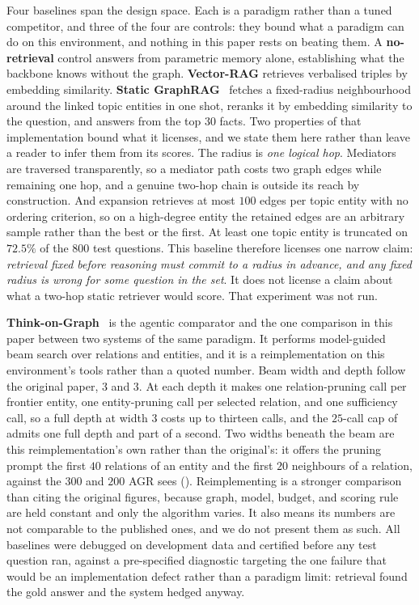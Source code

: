 Four baselines span the design space. Each is a paradigm rather than a
tuned competitor, and three of the four are controls: they bound what a
paradigm can do on this environment, and nothing in this paper rests on
beating them. A \textbf{no-retrieval} control answers from parametric
memory alone, establishing what the backbone knows without the graph.
\textbf{Vector-RAG} retrieves verbalised triples by embedding
similarity. \textbf{Static GraphRAG}~\cite{edge2024local} fetches a
fixed-radius neighbourhood around the linked topic entities in one shot,
reranks it by embedding similarity to the question, and answers from the
top $30$ facts. Two properties of that implementation bound what it
licenses, and we state them here rather than leave a reader to infer
them from its scores. The radius is \emph{one logical hop}. Mediators
are traversed transparently, so a mediator path costs two graph edges
while remaining one hop, and a genuine two-hop chain is outside its
reach by construction. And expansion retrieves at most $100$ edges per
topic entity with no ordering criterion, so on a high-degree entity the
retained edges are an arbitrary sample rather than the best or the
first. At least one topic entity is truncated on $72.5\%$ of the $800$
test questions. This baseline therefore licenses one narrow claim:
\emph{retrieval fixed before reasoning must commit to a radius in
advance, and any fixed radius is wrong for some question in the set}. It
does not license a claim about what a two-hop static retriever would
score. That experiment was not run.

\textbf{Think-on-Graph}~\cite{sun2024think} is the agentic comparator
and the one comparison in this paper between two systems of the same
paradigm. It performs model-guided beam search over relations and
entities, and it is a reimplementation on this environment's tools
rather than a quoted number. Beam width and depth follow the original
paper, $3$ and $3$. At each depth it makes one relation-pruning call per
frontier entity, one entity-pruning call per selected relation, and one
sufficiency call, so a full depth at width $3$ costs up to thirteen
calls, and the $25$-call cap of  admits one full depth
and part of a second. Two widths beneath the beam are this
reimplementation's own rather than the original's: it offers the pruning
prompt the first $40$ relations of an entity and the first $20$
neighbours of a relation, against the $300$ and $200$ AGR sees
(). Reimplementing is a stronger comparison than citing
the original figures, because graph, model, budget, and scoring rule are
held constant and only the algorithm varies. It also means its numbers
are not comparable to the published ones, and we do not present them as
such. All baselines were debugged on development data and certified
before any test question ran, against a pre-specified diagnostic
targeting the one failure that would be an implementation defect rather
than a paradigm limit: retrieval found the gold answer and the system
hedged anyway.

